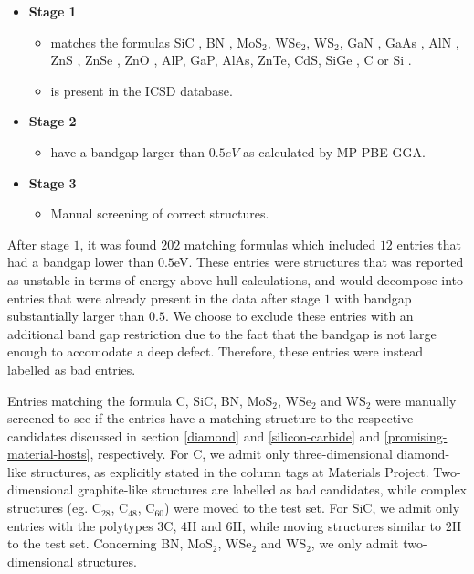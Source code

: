 \begin{itemize}
  \item[]{\textbf{Stage 1}}
  \begin{itemize}
  \item matches the formulas SiC \cite{Neudeck1995, Weber2010, Son2020, Falk2013, Martienssen2005}, BN \cite{Toth2019, Atatuere2018}, MoS$_2$\cite{Atatuere2018}, WSe$_2$\cite{Atatuere2018}, WS$_2$\cite{Atatuere2018}, GaN \cite{Berhane2018}, GaAs \cite{Wang2014}, AlN \cite{Weber2010, Xue2020}, ZnS \cite{Zhang2020}, ZnSe \cite{Weber2010}, ZnO \cite{Zhang2020}, AlP\cite{Weber2010}, GaP\cite{Weber2010}, AlAs\cite{Weber2010}, ZnTe\cite{Weber2010}, CdS\cite{Weber2010}, SiGe \cite{Hardy2019}, C \cite{Taylor2008, Barclay2011, Gordon2013} or Si \cite{Redjem2020, Zhang2020}.
  \item is present in the ICSD database.
  \end{itemize}
  \item[]{\textbf{Stage 2}}
  \begin{itemize}
  \item have a bandgap larger than $0.5eV$ as calculated by MP PBE-GGA.
  \end{itemize}
  \item[]{\textbf{Stage 3}}
  \begin{itemize}
  \item Manual screening of correct structures.
  \end{itemize}
\end{itemize}

After stage $1$, it was found $202$ matching formulas which included $12$ entries that had a bandgap lower than $0.5$eV. These entries were structures that was reported as unstable in terms of energy above hull calculations, and would decompose into entries that were already present in the data after stage $1$ with bandgap substantially larger than $0.5$. We choose to exclude these entries with an additional band gap restriction due to the fact that the bandgap is not large enough to accomodate a deep defect. Therefore, these entries were instead labelled as bad entries.

Entries matching the formula C, SiC, BN, MoS$_2$, WSe$_2$ and  WS$_2$ were manually screened to see if the entries have a matching structure to the respective candidates discussed in section \ref{diamond} and \ref{silicon-carbide} and \ref{promising-material-hosts}, respectively. For C, we admit only three-dimensional diamond-like structures, as explicitly stated in the column tags at Materials Project. Two-dimensional graphite-like structures are labelled as bad candidates, while complex structures (eg. C$_{28}$, C$_{48}$, C$_{60}$) were moved to the test set. For SiC, we admit only entries with the polytypes $3$C, $4$H and $6$H, while moving structures similar to $2$H to the test set. Concerning BN, MoS$_2$, WSe$_2$ and  WS$_2$, we only admit two-dimensional structures.

